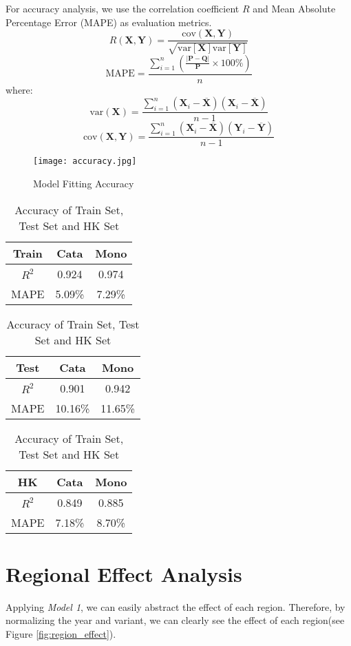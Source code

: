 \documentclass[12pt]{article}  %
\begin{document}
For accuracy analysis, we use the correlation coefficient $R$ and Mean Absolute Percentage Error (MAPE) as evaluation metrics.
$$R(\textbf{X},\textbf{Y})=\frac{\text{cov}(\textbf{X},\textbf{Y})}{\sqrt{\text{var}[\textbf{X}] \text{var}[\textbf{Y}]}}$$
$$\text{MAPE} = \frac{\sum_{i = 1}^n (\frac{|\textbf{P} - \textbf{Q}|}{\textbf{P}} \times 100\%)}{n}$$
where:
    $$\text{var}(\textbf{X})=\frac{\sum_{i=1}^{n}(\textbf{X}_i-\overline{\textbf{X}})(\textbf{X}_i-\overline{\textbf{X}})}{n-1}$$
    $$\text{cov}(\textbf{X},\textbf{Y})=\frac{\sum_{i=1}^{n}(\textbf{X}_i-\overline{\textbf{X}})(\textbf{Y}_i-\overline{\textbf{Y}})}{n-1}$$

\begin{figure}[htbp]
        \centering
        \texttt{[image: accuracy.jpg]}
        \caption{Model Fitting Accuracy}\label{fig:accuracy}
\end{figure}


\begin{table}[htbp]
        \centering
        \begin{tabular}{c|c|c}
        Train& Cata& Mono \\
        \hline
        \hline
        $R^2$ & 0.924 & 0.974 \\
        \hline
        MAPE & 5.09\% & 7.29\% \\
        \hline
        \end{tabular}
        \qquad
        \begin{tabular}{c|c|c}
        Test& Cata& Mono \\
        \hline
        \hline
        $R^2$ & 0.901 & 0.942 \\
        \hline
        MAPE & 10.16\% & 11.65\% \\
        \hline
        \end{tabular}
        \qquad
        \begin{tabular}{c|c|c}
        HK& Cata& Mono \\
            \hline
            \hline
            $R^2$ & 0.849 & 0.885 \\
            \hline
            MAPE & 7.18\% & 8.70\% \\
            \hline
            \end{tabular}
        \caption{Accuracy of Train Set, Test Set and HK Set}
        \label{tab:Accuracy}
\end{table}



\section{Regional Effect Analysis}
Applying \emph{Model 1}, we can easily abstract the effect of each region. 
Therefore, by normalizing the year and variant, 
we can clearly see the effect of each region(see Figure \ref{fig:region_effect}).
\end{document}
